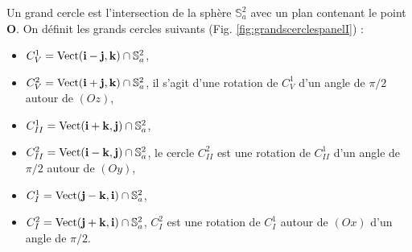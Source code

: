 Un grand cercle est l'intersection de la sphère $\mathbb{S}_a^2$ avec un plan contenant le point $\mathbf{O}$. On définit les grands cercles suivants (Fig. \ref{fig:grandscerclespanelI}) :

\begin{itemize}
\item $C_V^1 = \text{Vect}(\mathbf{i}-\mathbf{j}, \mathbf{k}) \cap \mathbb{S}_a^2$,
\item $C_V^2 = \text{Vect}(\mathbf{i}+\mathbf{j}, \mathbf{k}) \cap \mathbb{S}_a^2$, il s'agit d'une rotation de $C_V^1$ d'un angle de $\pi/2$ autour de $(Oz)$,
\item $C_{II}^1 = \text{Vect}(\mathbf{i}+\mathbf{k}, \mathbf{j}) \cap \mathbb{S}_a^2$,
\item $C_{II}^2 = \text{Vect}(\mathbf{i}-\mathbf{k}, \mathbf{j}) \cap \mathbb{S}_a^2$, le cercle $C_{II}^2$ est une rotation de $C_{II}^1$ d'un angle de $\pi/2$ autour de $(Oy)$,
\item $C_I^1=\text{Vect}(\mathbf{j}-\mathbf{k},\mathbf{i}) \cap \mathbb{S}_a^2$,
\item $C_I^2=\text{Vect}(\mathbf{j}+\mathbf{k},\mathbf{i}) \cap \mathbb{S}_a^2$, $C_I^2$ est une rotation de $C_I^1$ autour de $(Ox)$ d'un angle de $\pi/2$.
\end{itemize}

